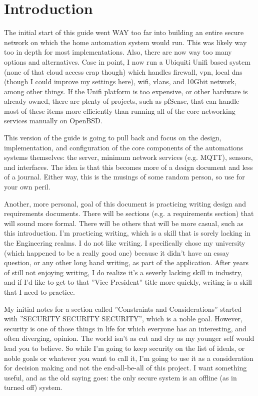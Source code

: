 \chapter{Introduction}


The initial start of this guide went WAY too far into building an entire secure network on which the home automation
system would run.  This was likely way too in depth for most implementations.  Also, there are now way too many options
and alternatives.  Case in point, I now run a Ubiquiti Unifi based system (none of that cloud access crap though) which
handles firewall, vpn, local dns (though I could improve my settings here), wifi, vlans, and 10Gbit network, among other
things.  If the Unifi platform is too expensive, or other hardware is already owned, there are plenty of projects, such
as pfSense, that can handle most of these items more efficiently than running all of the core networking services
manually on OpenBSD.

This version of the guide is going to pull back and focus on the design, implementation, and configuration of the core
components of the automations systems themselves: the server, minimum network services (e.g. MQTT), sensors, and
interfaces.  The idea is that this becomes more of a design document and less of a journal.  Either way, this is the
musings of some random person, so use for your own peril.

Another, more personal, goal of this document is practicing writing design and requirements documents.  There will be
sections (e.g. a requirements section) that will sound more formal.  There will be others that will be more casual, such
as this introduction.  I'm practicing writing, which is a skill that is sorely lacking in the Engineering realms.  I do
not like writing.  I specifically chose my university (which happened to be a really good one) because it didn't have an
essay question, or any other long hand writing, as part of the application.  After years of still not enjoying writing,
I do realize it's a severly lacking skill in industry, and if I'd like to get to that ''Vice President'' title more
quickly, writing is a skill that I need to practice.

My initial notes for a section called ''Constraints and Considerations'' started with ''SECURITY SECURITY
SECURITY'', which is a noble goal.  However, security is one of those things in life for which everyone has an
interesting, and often diverging, opinion.  The world isn't as cut and dry as my younger self would lead you to believe.
So while I'm going to keep security on the list of ideals, or noble goals or whatever you want to call it, I'm going
to use it as a consideration for decision making and not the end-all-be-all of this project.  I want something useful,
and as the old saying goes: the only secure system is an offline (as in turned off) system.


